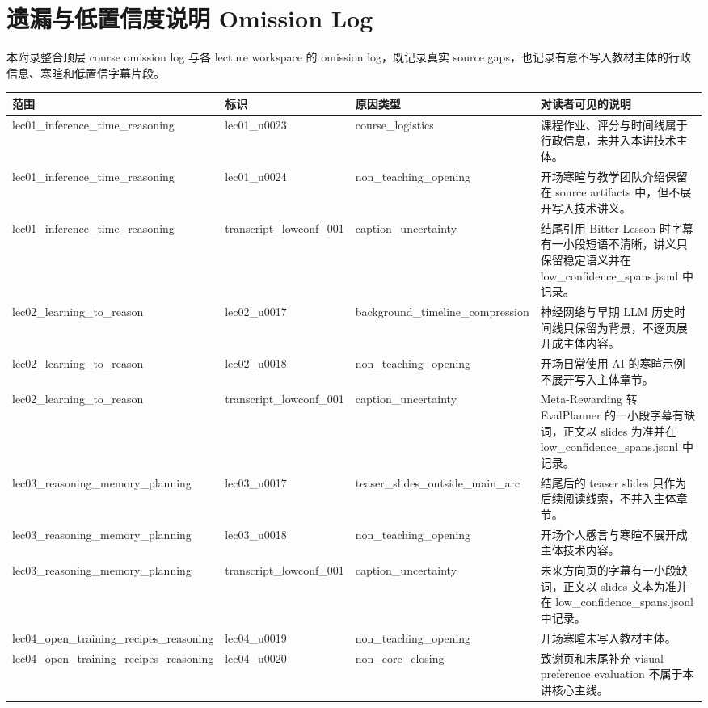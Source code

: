 \chapter{遗漏与低置信度说明 Omission Log}
本附录整合顶层 course omission log 与各 lecture workspace 的 omission log，既记录真实 source gaps，也记录有意不写入教材主体的行政信息、寒暄和低置信字幕片段。
\small
\begin{longtable}{p{}p{}p{}p{}}
\toprule
范围 & 标识 & 原因类型 & 对读者可见的说明 \\
\midrule
\endhead
lec01\_inference\_time\_reasoning & lec01\_u0023 & course\_logistics & 课程作业、评分与时间线属于行政信息，未并入本讲技术主体。 \\
lec01\_inference\_time\_reasoning & lec01\_u0024 & non\_teaching\_opening & 开场寒暄与教学团队介绍保留在 source artifacts 中，但不展开写入技术讲义。 \\
lec01\_inference\_time\_reasoning & transcript\_lowconf\_001 & caption\_uncertainty & 结尾引用 Bitter Lesson 时字幕有一小段短语不清晰，讲义只保留稳定语义并在 low\_confidence\_spans.jsonl 中记录。 \\
lec02\_learning\_to\_reason & lec02\_u0017 & background\_timeline\_compression & 神经网络与早期 LLM 历史时间线只保留为背景，不逐页展开成主体内容。 \\
lec02\_learning\_to\_reason & lec02\_u0018 & non\_teaching\_opening & 开场日常使用 AI 的寒暄示例不展开写入主体章节。 \\
lec02\_learning\_to\_reason & transcript\_lowconf\_001 & caption\_uncertainty & Meta-Rewarding 转 EvalPlanner 的一小段字幕有缺词，正文以 slides 为准并在 low\_confidence\_spans.jsonl 中记录。 \\
lec03\_reasoning\_memory\_planning & lec03\_u0017 & teaser\_slides\_outside\_main\_arc & 结尾后的 teaser slides 只作为后续阅读线索，不并入主体章节。 \\
lec03\_reasoning\_memory\_planning & lec03\_u0018 & non\_teaching\_opening & 开场个人感言与寒暄不展开成主体技术内容。 \\
lec03\_reasoning\_memory\_planning & transcript\_lowconf\_001 & caption\_uncertainty & 未来方向页的字幕有一小段缺词，正文以 slides 文本为准并在 low\_confidence\_spans.jsonl 中记录。 \\
lec04\_open\_training\_recipes\_reasoning & lec04\_u0019 & non\_teaching\_opening & 开场寒暄未写入教材主体。 \\
lec04\_open\_training\_recipes\_reasoning & lec04\_u0020 & non\_core\_closing & 致谢页和末尾补充 visual preference evaluation 不属于本讲核心主线。 \\

\end{longtable}
